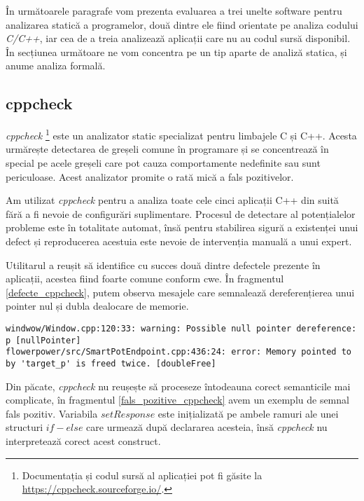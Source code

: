 În următoarele paragrafe vom prezenta evaluarea a trei unelte software pentru analizarea statică a programelor, două dintre ele fiind orientate pe analiza codului \textit{C/C++}, iar cea de a treia analizează aplicații care nu au codul sursă disponibil. În secțiunea următoare ne vom concentra pe un tip aparte de analiză statica, și anume analiza formală.

\subsection{cppcheck}

\textit{cppcheck} \footnote{Documentația și codul sursă al aplicației pot fi găsite la \url{https://cppcheck.sourceforge.io/}.} este un analizator static specializat pentru limbajele C și C++. Acesta urmărește detectarea de greșeli comune în programare și se concentrează în special pe acele greșeli care pot cauza comportamente nedefinite sau sunt periculoase. Acest analizator promite o rată mică a fals pozitivelor.

Am utilizat \textit{cppcheck} pentru a analiza toate cele cinci aplicații C++ din suită fără a fi nevoie de configurări suplimentare. Procesul de detectare al potențialelor probleme este în totalitate automat, însă pentru stabilirea sigură a existenței unui defect și reproducerea acestuia este nevoie de intervenția manuală a unui expert.

Utilitarul a reușit să identifice cu succes două dintre defectele prezente în aplicații, acestea fiind foarte comune conform \acrfull{cwe}. În fragmentul \ref{defecte_cppcheck}, putem observa mesajele care semnalează dereferențierea unui pointer nul și dubla dealocare de memorie. 

\begin{lstlisting}[caption={Cele două defecte detectate de \textit{cppcheck}}, label={defecte_cppcheck}]
windwow/Window.cpp:120:33: warning: Possible null pointer dereference: p [nullPointer]
flowerpower/src/SmartPotEndpoint.cpp:436:24: error: Memory pointed to by 'target_p' is freed twice. [doubleFree]
\end{lstlisting}

Din păcate, \textit{cppcheck} nu reușește să proceseze întodeauna corect semanticile mai complicate, în fragmentul \ref{fals_pozitive_cppcheck} avem un exemplu de semnal fals pozitiv. Variabila $setResponse$ este inițializată pe ambele ramuri ale unei structuri $if - else$ care urmează după declararea acesteia, însă \textit{cppcheck} nu interpretează corect acest construct.

